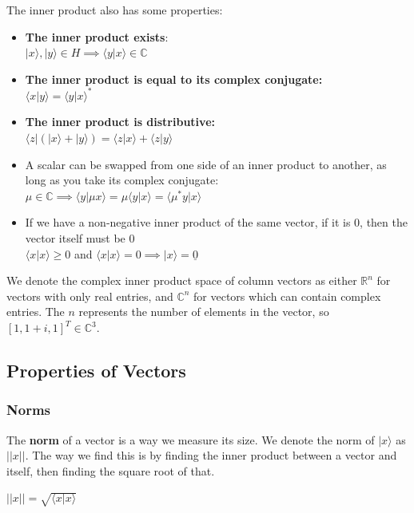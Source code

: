 \documentclass[12pt]{article}
\begin{document}
The inner product also has some properties:

\begin{itemize}
	\item \textbf{The inner product exists}:\\$\lvert x \rangle, \lvert y \rangle \in H \implies \langle y \vert x \rangle \in \mathbb{C}$
	\item \textbf{The inner product is equal to its complex conjugate:}\\$\langle x \vert y \rangle = \langle y \vert x \rangle^*$
	\item \textbf{The inner product is distributive:}\\$\langle z \rvert (\lvert x \rangle + \lvert y \rangle) = \langle z \vert x \rangle + \langle z \vert y \rangle$
	\item A scalar can be swapped from one side of an inner product to another, as long as you take its complex conjugate:\\$\mu \in \mathbb{C} \implies \langle y \vert \mu x \rangle = \mu \langle y \vert x \rangle = \langle \mu^*y \vert x \rangle$
	\item If we have a non-negative inner product of the same vector, if it is 0, then the vector itself must be 0\\$\langle x \vert x \rangle \geq 0$ and $\langle x \vert x \rangle = 0 \implies \lvert x \rangle = \underline{0}$
\end{itemize}

We denote the complex inner product space of column vectors as either $\mathbb{R}^n$ for vectors with only real entries, and $\mathbb{C}^n$ for vectors which can contain complex entries. The $n$ represents the number of elements in the vector, so $[1, 1+i, 1]^T \in \mathbb{C}^3$.

\subsection{Properties of Vectors}

\subsubsection{Norms}
The \textbf{norm} of a vector is a way we measure its size. We denote the norm of $\lvert x \rangle$ as $\lvert \lvert x \rvert \rvert$. The way we find this is by finding the inner product between a vector and itself, then finding the square root of that.

\begin{center}
	$\lvert \lvert x \rvert \rvert = \sqrt{\langle x \vert x \rangle}$
\end{center}
\end{document}
